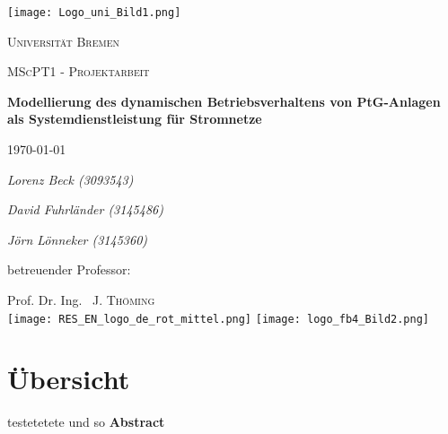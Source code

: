 \documentclass[onecolumn,10pt,titlepage]{article}
\begin{document}
\begin{titlepage}
	\centering
	
	{\texttt{[image: Logo\_uni\_Bild1.png]}\par}
	\vspace{1cm}
	{\scshape\Large Universität Bremen \par}
	\vspace{1cm}
	{\scshape\LARGE MScPT1 - Projektarbeit \par}
	\vspace{1.5cm}
	{\huge\bfseries Modellierung des dynamischen Betriebsverhaltens von PtG-Anlagen als Systemdienstleistung für Stromnetze\par}
	\vspace{2cm}
    {\large \today\par}
    \vspace{2cm}
	{\Large\itshape Lorenz Beck (3093543)\par}
    \vspace{0.3cm}
    {\Large\itshape David Fuhrländer (3145486)\par}
    \vspace{0.3cm}
    {\Large\itshape Jörn Lönneker (3145360)\par}
	\vfill
	betreuender Professor:\par
	Prof. Dr. Ing. ~J. \textsc{Thöming}\\

    \vfill
   	\texttt{[image: RES\_EN\_logo\_de\_rot\_mittel.png]}
	\hfill	
	\texttt{[image: logo\_fb4\_Bild2.png]}%

	
\end{titlepage}

\onehalfspace

\section*{Übersicht}
testetetete
und so
{\textbf{Abstract}}\par
\end{document}
